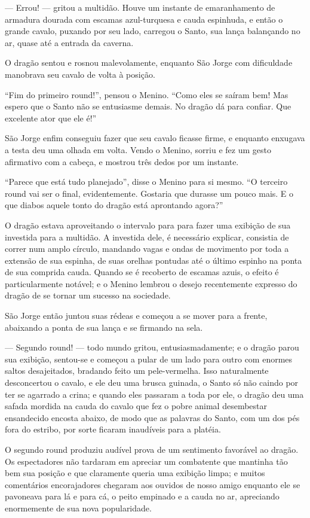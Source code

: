 — Errou! — gritou a multidão. Houve um instante de emaranhamento de
armadura dourada com escamas azul-turquesa e cauda espinhuda, e então
o grande cavalo, puxando por seu lado, carregou o Santo, sua lança
balançando no ar, quase até a entrada da caverna.

O dragão sentou e rosnou malevolamente, enquanto São Jorge com
dificuldade manobrava seu cavalo de volta à posição.

“Fim do primeiro round!”, pensou o Menino. “Como eles se saíram bem!
Mas espero que o Santo não se entusiasme demais. No dragão dá para
confiar. Que excelente ator que ele é!”

São Jorge enfim conseguiu fazer que seu cavalo ficasse firme, e
enquanto enxugava a testa deu uma olhada em volta. Vendo o Menino,
sorriu e fez um gesto afirmativo com a cabeça, e mostrou três dedos
por um instante.

“Parece que está tudo planejado”, disse o Menino para si mesmo. “O
terceiro round vai ser o final, evidentemente. Gostaria que durasse
um pouco mais. E o que diabos aquele tonto do dragão está aprontando
agora?”

O dragão estava aproveitando o intervalo para para fazer uma exibição
de sua investida para a multidão. A investida dele, é necessário
explicar, consistia de correr num amplo círculo, mandando vagas e
ondas de movimento por toda a extensão de sua espinha, de suas
orelhas pontudas até o último espinho na ponta de sua comprida cauda.
Quando se é recoberto de escamas azuis, o efeito é particularmente
notável; e o Menino lembrou o desejo recentemente expresso do dragão
de se tornar um sucesso na sociedade. 

São Jorge então juntou suas rédeas e começou a se mover para a frente,
abaixando a ponta de sua lança e se firmando na sela.

— Segundo round! — todo mundo gritou, entusiasmadamente; e o dragão
parou sua exibição, sentou-se e começou a pular de um lado para outro
com enormes saltos desajeitados, bradando feito um pele-vermelha.
Isso naturalmente desconcertou o cavalo, e ele deu uma brusca
guinada, o Santo só não caindo por ter se agarrado a crina; e quando
eles passaram a toda por ele, o dragão deu uma safada mordida na
cauda do cavalo que fez o pobre animal desembestar ensandecido
encosta abaixo, de modo que as palavras do Santo, com um dos pés fora
do estribo, por sorte ficaram inaudíveis para a platéia.

O segundo round produziu audível prova de um sentimento favorável ao
dragão. Os espectadores não tardaram em apreciar um combatente que
mantinha tão bem sua posição e que claramente queria uma exibição
limpa; e muitos comentários encorajadores chegaram aos ouvidos de
nosso amigo enquanto ele se pavoneava para lá e para cá, o peito
empinado e a cauda no ar, apreciando enormemente de sua nova
popularidade.


